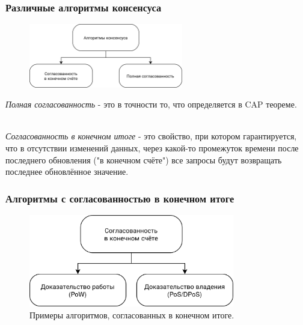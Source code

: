 \documentclass[pdf, 10pt, unicode,aspectratio=169]{beamer} %
\begin{document}
\begin{frame}
\frametitle{Различные алгоритмы консенсуса}


\begin{figure}[H]
\centering
\includegraphics[width=0.6\textwidth]{src/pics/consensus_types_1.png}
\label{fig:consensus_types_1}
\end{figure}

\emph{Полная согласованность} - это в точности то, что определяется в CAP теореме.\\\

\emph{Согласованность в конечном итоге} - это свойство, при котором гарантируется, что в отсутствии изменений данных, через какой-то промежуток времени после последнего обновления ("в конечном счёте") все запросы будут возвращать последнее обновлённое значение.

\end{frame}


\begin{frame}
\frametitle{Алгоритмы с согласованностью в конечном итоге}

\begin{figure}[H]
\centering
\includegraphics[width=0.8\textwidth]{src/pics/consensus_types_2.png}
\caption{Примеры алгоритмов, согласованных в конечном итоге.}
\label{fig:consensus_types_2}
\end{figure}

\end{frame}
\end{document}
